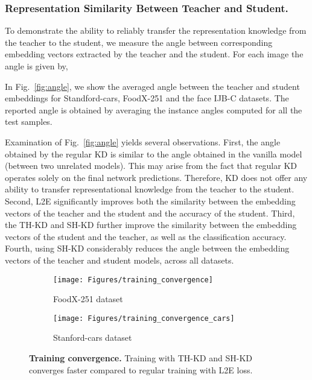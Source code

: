 \subsubsection{Representation Similarity Between Teacher and Student.} \label{subsec:rep}
To demonstrate the ability to reliably transfer the representation knowledge from the teacher to the student, we measure the angle between corresponding embedding vectors extracted by the teacher and the student.
For each image the angle is given by,

In Fig.~\ref{fig:angle}, we show the averaged angle between the teacher and student embeddings for Standford-cars, FoodX-251 and the face IJB-C datasets. The reported angle is obtained by averaging the instance angles  computed for all the test samples. 

Examination of Fig.~\ref{fig:angle} yields several observations.
First, the angle obtained by the regular KD is similar to the angle obtained in the vanilla model (between two unrelated models). This may arise from the fact that regular KD operates solely on the final network predictions. Therefore, KD does not offer any ability to transfer representational knowledge from the teacher to the student.
Second, L2E significantly improves both the similarity between the embedding vectors of the teacher and the student and the accuracy of the student. 
Third, the TH-KD and SH-KD further improve the similarity between the embedding vectors of the student and the teacher, as well as the classification accuracy. Fourth, using SH-KD considerably reduces the angle between the embedding vectors of the teacher and student models, across all datasets.
    


\begin{figure*}[t!]
\begin{subfigure}[a]{0.5\textwidth}\label{subfig:converge_cars}
  \centering
  \texttt{[image: Figures/training\_convergence]}
  \caption{FoodX-251 dataset}
\end{subfigure}\begin{subfigure}[h]{0.5\textwidth }\label{subfig:converge_food}
  \centering
  \texttt{[image: Figures/training\_convergence\_cars]}
  \caption{Stanford-cars dataset}
\end{subfigure}
\vspace{-3mm}
  \caption{\textbf{Training convergence.} 
  Training with TH-KD and SH-KD converges faster compared to regular training with L2E loss.}
\label{fig:accelerate}
\vspace{-3mm}
\end{figure*}

